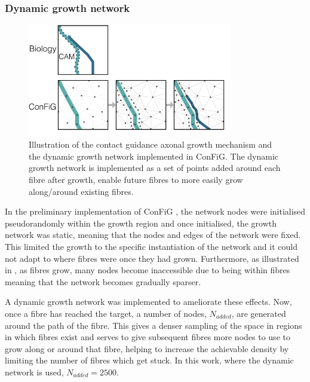 \subsubsection{Dynamic growth network}
\label{sec:config_dynam_growth}

\begin{figure}
  \centering
  \includegraphics[width=0.8\textwidth]{figures/config/biological_cam.png}
  \caption[Illustration of the contact guidance mechanism]{Illustration of the contact guidance axonal growth mechanism and the dynamic growth network implemented in \ac{ConFiG}. The dynamic growth network is implemented as a set of points added around each fibre after growth, enable future fibres to more easily grow along/around existing fibres.}
  \label{fig:config_dynam_growth}
\end{figure}

In the preliminary implementation of \ac{ConFiG} \cite{Callaghan2019}, the network nodes were initialised pseudorandomly within the growth region and once initialised, the growth network was static, meaning that the nodes and edges of the network were fixed. This limited the growth to the specific instantiation of the network and it could not adapt to where fibres were once they had grown. Furthermore, as illustrated in , as fibres grow, many nodes become inaccessible due to being within fibres meaning that the network becomes gradually sparser.

A dynamic growth network was implemented to ameliorate these effects. Now, once a fibre has reached the target, a number of nodes, $N_{added}$, are generated around the path of the fibre. This gives a denser sampling of the space in regions in which fibres exist and serves to give subsequent fibres more nodes to use to grow along or around that fibre, helping to increase the achievable density by limiting the number of fibres which get stuck. In this work, where the dynamic network is used, $N_{added}=2500$.

